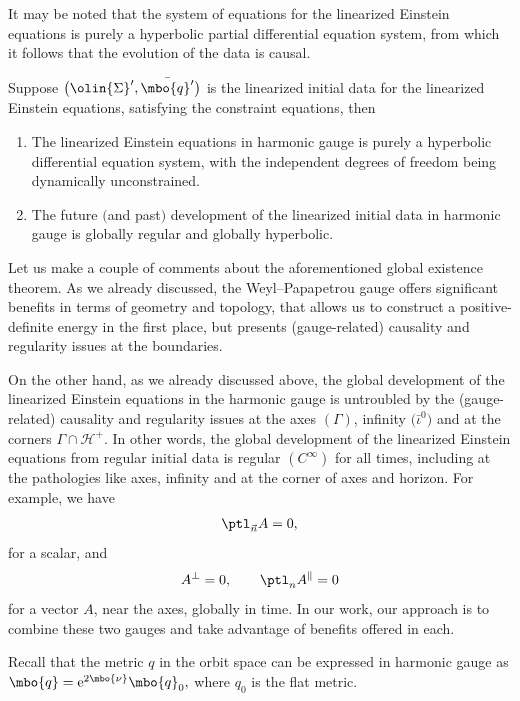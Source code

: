 It may be noted that the system of equations for the linearized Einstein equations is purely a hyperbolic partial differential equation system, from which it follows that the evolution of the data is causal.
\begin{Proposition}
Suppose $\bigl(\olin{\Sigma}', \bar{\mbo{q}'}\bigr)$ is the linearized initial data for the linearized Einstein equations, satisfying the constraint equations, then
\begin{enumerate}\itemsep=0pt
\item[$(1)$] The linearized Einstein equations in harmonic gauge is purely a hyperbolic differential equation system, with the independent degrees of freedom being dynamically unconstrained.
\item[$(2)$] The future $($and past$)$ development of the linearized initial data in harmonic gauge is globally regular and globally hyperbolic.
\end{enumerate}
\end{Proposition}
Let us make a couple of comments about the aforementioned global existence theorem. As we already discussed, the Weyl--Papapetrou gauge offers significant benefits in terms of geometry and topology, that allows us to construct a positive-definite energy in the first place, but presents (gauge-related) causality and regularity issues at the boundaries.

On the other hand, as we already discussed above, the global development of the linearized Einstein equations in the harmonic gauge is untroubled by the (gauge-related) causality and regularity issues at the axes $(\Gamma)$, infinity $\bigl(\bar{\iota}^0\bigr)$ and at the corners $\Gamma \cap \mathcal{H}^+$. In other words, the global development of the linearized Einstein equations from regular initial data is regular $(C^\infty)$ for all times, including at the pathologies like axes, infinity and at the corner of axes and horizon. For example, we have
\begin{align*}
\ptl_{\vec{n}} A =0,
\end{align*}
for a scalar, and
\[
A^{\perp} =0, \qquad \ptl_n A^{\parallel} =0
\]
for a vector $A$, near the axes, globally in time. In our work, our approach is to combine these two gauges and take advantage of benefits offered in each.

Recall that the metric $q$ in the orbit space can be expressed in harmonic gauge as $\mbo{q} = {\rm e}^{2 \mbo{\nu}} \mbo{q}_0, $ where $q_0$ is the flat metric.

